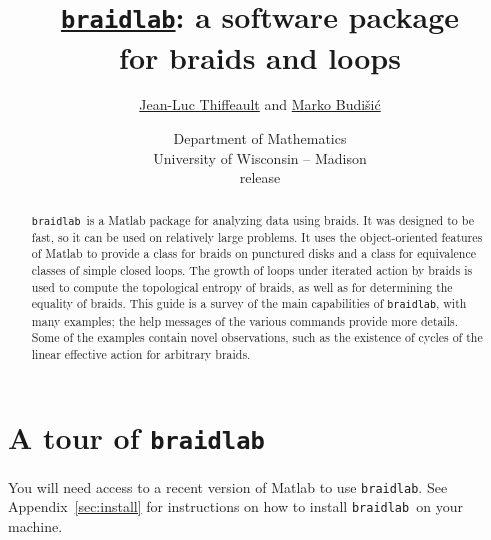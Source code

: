 \documentclass[12pt]{article}
\newcommand{\braidlab}{\texttt{braidlab}}%
\begin{document}
\lstset{language=Matlab}
\lstset{breaklines=true}

\lstset{%
basicstyle=\small\ttfamily,
keywordstyle=\small\ttfamily,
identifierstyle=,
commentstyle=\small\rmfamily\itshape,%
stringstyle=\small\ttfamily,
showstringspaces=false}


\title{\href{{http://github.com/jeanluct/braidlab}}{\braidlab}:
  a software package \\ for braids and loops}
\author{%
\href{http://www.math.wisc.edu/~jeanluc}{Jean-Luc Thiffeault}
  and
\href{http://mbudisic.wordpress.com}{Marko Budi\v{s}i\'{c}}
}
\date{{\small Department of Mathematics\\ University of
    Wisconsin -- Madison} \\[10pt]
  release } %

\maketitle

\begin{abstract}
  \braidlab\ is a Matlab package for analyzing data using braids.  It was
  designed to be fast, so it can be used on relatively large problems.  It
  uses the object-oriented features of Matlab to provide a class for braids on
  punctured disks and a class for equivalence classes of simple closed loops.
  The growth of loops under iterated action by braids is used to compute the
  topological entropy of braids, as well as for determining the equality of
  braids.  This guide is a survey of the main capabilities of \braidlab, with
  many examples; the help messages of the various commands provide more
  details.  Some of the examples contain novel observations, such as the
  existence of cycles of the linear effective action for arbitrary braids.
\end{abstract}

\tableofcontents


\section{A tour of \braidlab}
\label{sec:tour}

You will need access to a recent version of Matlab to use \braidlab.  See
Appendix~\ref{sec:install} for instructions on how to install \braidlab\ on
your machine.
\end{document}
